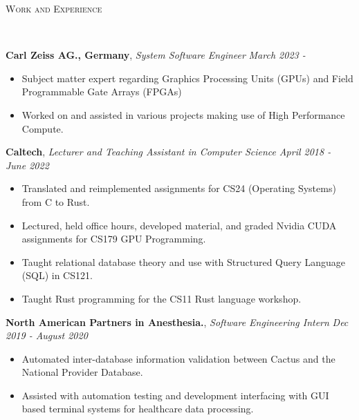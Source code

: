 \documentclass[9pt]{article}
\newenvironment{changemargin}[2]{%
  \begin{list}{}{%
    \setlength{\topsep}{0pt}%
    \setlength{\leftmargin}{#1}%
    \setlength{\rightmargin}{#2}%
    \setlength{\listparindent}{\parindent}%
    \setlength{\itemindent}{\parindent}%
    \setlength{\parsep}{\parskip}%
  }%
  \item[]}{\end{list}
}
\newcommand{\lineover}{
	\begin{changemargin}{-0.05in}{-0.05in}
		\vspace*{-8pt}
		\hrulefill \\
		\vspace*{-2pt}
	\end{changemargin}
}
\newcommand{\header}[1]{
	\begin{changemargin}{-0.5in}{-0.5in}
		\scshape{#1}\\
  	\lineover
	\end{changemargin}
}
\newenvironment{body} {
	\vspace*{-16pt}
	\begin{changemargin}{-0.25in}{-0.5in}
  }	
	{\end{changemargin}
}
\begin{document}
\header{Work and Experience}
\begin{body}
	\vspace{14pt}
	\textbf{Carl Zeiss AG., Germany}, \emph{System Software Engineer} \hfill \emph{March 2023 - }\\
	\vspace*{-3pt}
	\begin{itemize} \itemsep -0pt %
		\item Subject matter expert regarding Graphics Processing Units (GPUs) and Field Programmable Gate Arrays (FPGAs)
		\item Worked on and assisted in various projects making use of High Performance Compute.
	\end{itemize}
	\vspace*{-2pt}
 
	\textbf{Caltech}, \emph{Lecturer and Teaching Assistant in Computer Science} \hfill \emph{April 2018 - June 2022}\\
	\vspace*{-3pt}
	\begin{itemize} \itemsep -0pt %
		\item Translated and reimplemented assignments for CS24 (Operating
		Systems) from C to Rust.
		\item Lectured, held office hours, developed material, and graded Nvidia CUDA assignments for CS179 GPU Programming.
		\item Taught relational database theory and use with Structured Query Language
		      (SQL) in CS121.
		\item Taught Rust programming for the CS11 Rust language workshop.
	\end{itemize}
	\vspace*{-2pt}

	\textbf{North American Partners in Anesthesia.}, \emph{Software Engineering Intern} \hfill
	\emph{Dec 2019 - August 2020}\\
	\vspace*{-3pt}
	\begin{itemize} \itemsep -0pt %
		\item Automated inter-database information validation between Cactus and the
		      National Provider Database.
		\item Assisted with automation testing and development interfacing with GUI based terminal
		      systems for healthcare data processing.
	\end{itemize}
	\vspace*{-2pt}


\end{body}
\end{document}
